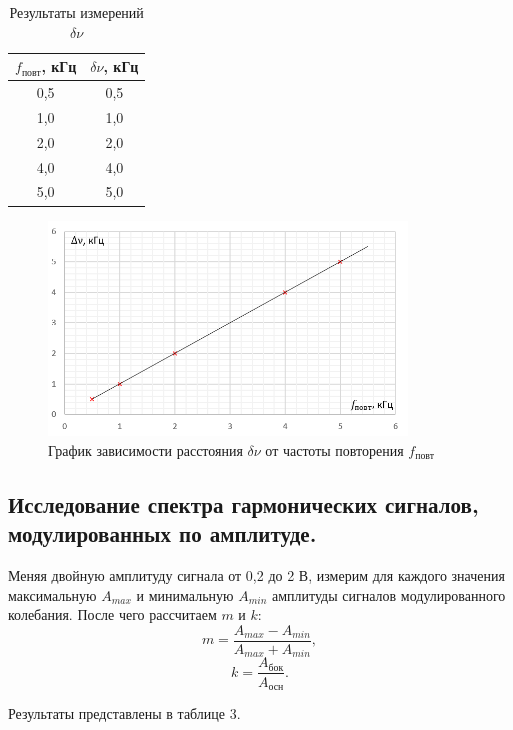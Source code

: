 \documentclass[a4paper]{article}
\theoremstyle{definition}
\theoremstyle{remark}
\begin{document}
 \begin{table}[h!]
    \centering
    \begin{tabular}{|c|c|}
    \hline
    $f_{\text{повт}}$, кГц & $\delta\nu$, кГц \\ \hline
    0,5 & 0,5                \\ \hline
    1,0 & 1,0                \\ \hline
    2,0 & 2,0                \\ \hline
    4,0 & 4,0                \\ \hline
    5,0 & 5,0                \\ \hline
    \end{tabular}
    \caption{Результаты измерений $\delta\nu$}
    \end{table}


    \begin{figure}[h!]
        \centering
        \includegraphics[width = 270pt]{image/graph2.png}
        \caption{График зависимости расстояния $\delta\nu$ от частоты повторения $f_{\text{повт}}$}
    \end{figure}


\subsection{Исследование спектра гармонических сигналов, модулированных по амплитуде.}

Меняя двойную амплитуду сигнала от 0,2 до 2 В, измерим для каждого значения максимальную $A_{max}$ и минимальную $A_{min}$ амплитуды сигналов модулированного колебания. После чего рассчитаем $m$ и $k$: $$m = \frac{A_{max} - A_{min}}{A_{max}+A_{min}},$$ $$k = \frac{A_{\text{бок}}}{A_{\text{осн}}}.$$ 

\noindent Результаты представлены в таблице 3.
\end{document}
